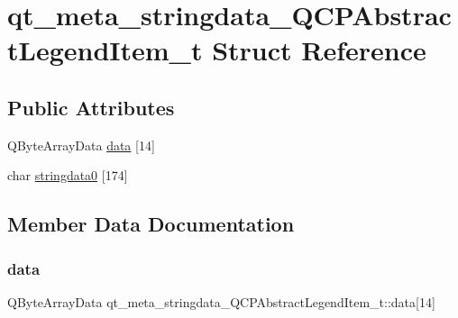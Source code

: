 \hypertarget{structqt__meta__stringdata__QCPAbstractLegendItem__t}{}\section{qt\+\_\+meta\+\_\+stringdata\+\_\+\+Q\+C\+P\+Abstract\+Legend\+Item\+\_\+t Struct Reference}
\label{structqt__meta__stringdata__QCPAbstractLegendItem__t}
\subsection*{Public Attributes}
\begin{DoxyCompactItemize}
\item 
Q\+Byte\+Array\+Data \mbox{\hyperlink{structqt__meta__stringdata__QCPAbstractLegendItem__t_afedc8a30b9d66c03673486e9c892c35b}{data}} \mbox{[}14\mbox{]}
\item 
char \mbox{\hyperlink{structqt__meta__stringdata__QCPAbstractLegendItem__t_a4987f6d279add0af922402e1f2e28b6b}{stringdata0}} \mbox{[}174\mbox{]}
\end{DoxyCompactItemize}


\subsection{Member Data Documentation}
\mbox{\label{structqt__meta__stringdata__QCPAbstractLegendItem__t_afedc8a30b9d66c03673486e9c892c35b}} 
\subsubsection{\texorpdfstring{data}{data}}
{\footnotesize\ttfamily Q\+Byte\+Array\+Data qt\+\_\+meta\+\_\+stringdata\+\_\+\+Q\+C\+P\+Abstract\+Legend\+Item\+\_\+t\+::data\mbox{[}14\mbox{]}}

\mbox{\label{structqt__meta__stringdata__QCPAbstractLegendItem__t_a4987f6d279add0af922402e1f2e28b6b}} 
